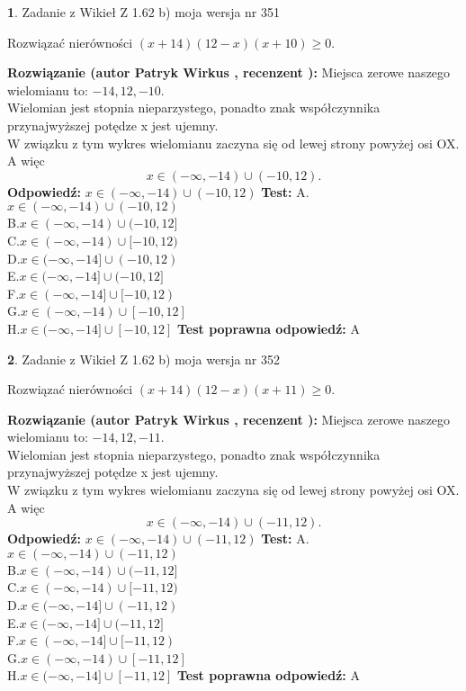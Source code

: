\documentclass[12pt, a4paper]{article}
\theoremstyle{definition} %
\newtheorem{zad}{}
\newcommand{\zadStart}[1]{\begin{zad}#1\newline}
\newcommand{\zadStop}{\end{zad}}
\newcommand{\rozwStart}[2]{\noindent \textbf{Rozwiązanie (autor #1 , recenzent #2): }\newline}
\newcommand{\rozwStop}{\newline}
\newcommand{\odpStart}{\noindent \textbf{Odpowiedź:}\newline}
\newcommand{\odpStop}{\newline}
\newcommand{\testStart}{\noindent \textbf{Test:}\newline}
\newcommand{\testStop}{\newline}
\newcommand{\kluczStart}{\noindent \textbf{Test poprawna odpowiedź:}\newline}
\newcommand{\kluczStop}{\newline}
\begin{document}
\zadStart{Zadanie z Wikieł Z 1.62 b) moja wersja nr 351}

Rozwiązać nierówności $(x+14)(12-x)(x+10)\ge0$.
\zadStop
\rozwStart{Patryk Wirkus}{}
Miejsca zerowe naszego wielomianu to: $-14, 12, -10$.\\
Wielomian jest stopnia nieparzystego, ponadto znak współczynnika przy\linebreak najwyższej potędze x jest ujemny.\\ W związku z tym wykres wielomianu zaczyna się od lewej strony powyżej osi OX. A więc $$x \in (-\infty,-14) \cup (-10,12).$$
\rozwStop
\odpStart
$x \in (-\infty,-14) \cup (-10,12)$
\odpStop
\testStart
A.$x \in (-\infty,-14) \cup (-10,12)$\\
B.$x \in (-\infty,-14) \cup (-10,12]$\\
C.$x \in (-\infty,-14) \cup [-10,12)$\\
D.$x \in (-\infty,-14] \cup (-10,12)$\\
E.$x \in (-\infty,-14] \cup (-10,12]$\\
F.$x \in (-\infty,-14] \cup [-10,12)$\\
G.$x \in (-\infty,-14) \cup [-10,12]$\\
H.$x \in (-\infty,-14] \cup [-10,12]$
\testStop
\kluczStart
A
\kluczStop



\zadStart{Zadanie z Wikieł Z 1.62 b) moja wersja nr 352}

Rozwiązać nierówności $(x+14)(12-x)(x+11)\ge0$.
\zadStop
\rozwStart{Patryk Wirkus}{}
Miejsca zerowe naszego wielomianu to: $-14, 12, -11$.\\
Wielomian jest stopnia nieparzystego, ponadto znak współczynnika przy\linebreak najwyższej potędze x jest ujemny.\\ W związku z tym wykres wielomianu zaczyna się od lewej strony powyżej osi OX. A więc $$x \in (-\infty,-14) \cup (-11,12).$$
\rozwStop
\odpStart
$x \in (-\infty,-14) \cup (-11,12)$
\odpStop
\testStart
A.$x \in (-\infty,-14) \cup (-11,12)$\\
B.$x \in (-\infty,-14) \cup (-11,12]$\\
C.$x \in (-\infty,-14) \cup [-11,12)$\\
D.$x \in (-\infty,-14] \cup (-11,12)$\\
E.$x \in (-\infty,-14] \cup (-11,12]$\\
F.$x \in (-\infty,-14] \cup [-11,12)$\\
G.$x \in (-\infty,-14) \cup [-11,12]$\\
H.$x \in (-\infty,-14] \cup [-11,12]$
\testStop
\kluczStart
A
\kluczStop
\end{document}
